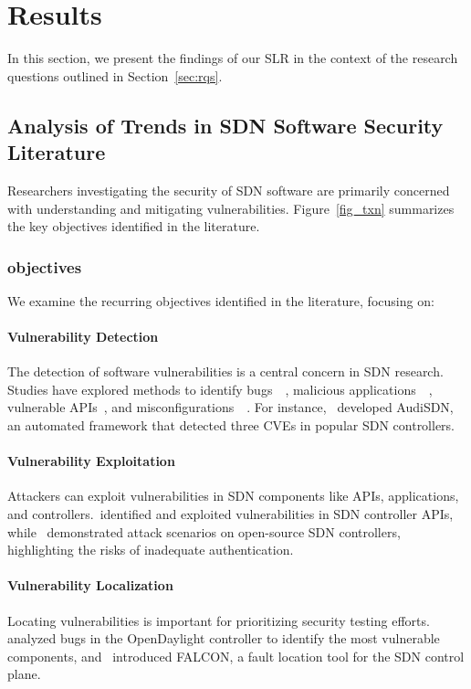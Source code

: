 \section{Results}\label{sec:rslt}
In this section, we present the findings of our SLR in the context of the research questions outlined in Section~\ref{sec:rqs}.

\subsection{Analysis of Trends in SDN Software Security Literature}
Researchers investigating the security of SDN software are primarily concerned with understanding and mitigating vulnerabilities. Figure~\ref{fig_txn} summarizes the key objectives identified in the literature.

\subsubsection{objectives}
We examine the recurring objectives identified in the literature, focusing on:
\paragraph{Vulnerability Detection} The detection of software vulnerabilities is a central concern in SDN research. Studies have explored methods to identify bugs~\citep{9505089}~\citep{7818438}, malicious applications~\citep{8109275}~\citep{10.1007/978-981-13-6508-9_13}, vulnerable APIs~\citep{8725649}, and misconfigurations~\citep{10.1145/2936314.2814218}~\citep{9155378}. For instance,~\cite{9681706} developed AudiSDN, an automated framework that detected three CVEs in popular SDN controllers.

\paragraph{Vulnerability Exploitation} Attackers can exploit vulnerabilities in SDN components like APIs, applications, and controllers.~\cite{9152642}identified and exploited vulnerabilities in SDN controller APIs, while~\cite{10.1145/2876019.2876024} demonstrated attack scenarios on open-source SDN controllers, highlighting the risks of inadequate authentication.

\paragraph{Vulnerability Localization} Locating vulnerabilities is important for prioritizing security testing efforts.~\cite{8717837} analyzed bugs in the OpenDaylight controller to identify the most vulnerable components, and~\cite{8717815} introduced FALCON, a fault location tool for the SDN control plane.

